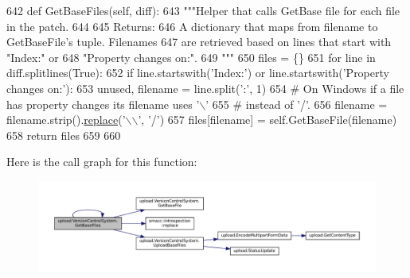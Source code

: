 \begin{DoxyCode}
642   \textcolor{keyword}{def }GetBaseFiles(self, diff):
643     \textcolor{stringliteral}{"""Helper that calls GetBase file for each file in the patch.}
644 \textcolor{stringliteral}{}
645 \textcolor{stringliteral}{    Returns:}
646 \textcolor{stringliteral}{      A dictionary that maps from filename to GetBaseFile's tuple.  Filenames}
647 \textcolor{stringliteral}{      are retrieved based on lines that start with "Index:" or}
648 \textcolor{stringliteral}{      "Property changes on:".}
649 \textcolor{stringliteral}{    """}
650     files = \{\}
651     \textcolor{keywordflow}{for} line \textcolor{keywordflow}{in} diff.splitlines(\textcolor{keyword}{True}):
652       \textcolor{keywordflow}{if} line.startswith(\textcolor{stringliteral}{'Index:'}) \textcolor{keywordflow}{or} line.startswith(\textcolor{stringliteral}{'Property changes on:'}):
653         unused, filename = line.split(\textcolor{stringliteral}{':'}, 1)
654         \textcolor{comment}{# On Windows if a file has property changes its filename uses '\(\backslash\)'}
655         \textcolor{comment}{# instead of '/'.}
656         filename = filename.strip().\hyperlink{namespacesmacc_1_1introspection_a48571b9bf3b115d2a83cc0147c96d0bd}{replace}(\textcolor{stringliteral}{'\(\backslash\)\(\backslash\)'}, \textcolor{stringliteral}{'/'})
657         files[filename] = self.GetBaseFile(filename)
658     \textcolor{keywordflow}{return} files
659 
660 
\end{DoxyCode}
Here is the call graph for this function\+:
\nopagebreak
\begin{figure}[H]
\begin{center}
\leavevmode
\includegraphics[width=350pt]{classupload_1_1VersionControlSystem_a812c3b3daf90c88b015fa4b26252e291_cgraph}
\end{center}
\end{figure}
\mbox{\label{classupload_1_1VersionControlSystem_a56a60e56aa9aff3df4001d2f84cab884}} 
